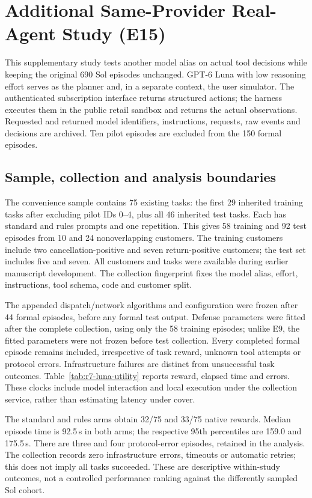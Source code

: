 \section{Additional Same-Provider Real-Agent Study (E15)}\label{sec:r7-luna}
This supplementary study tests another model alias on actual tool decisions while keeping the original 690 Sol episodes unchanged. GPT-6 Luna with low reasoning effort serves as the planner and, in a separate context, the user simulator. The authenticated subscription interface returns structured actions; the harness executes them in the public retail sandbox and returns the actual observations. Requested and returned model identifiers, instructions, requests, raw events and decisions are archived. Ten pilot episodes are excluded from the 150 formal episodes.

\subsection{Sample, collection and analysis boundaries}
The convenience sample contains 75 existing tasks: the first 29 inherited training tasks after excluding pilot IDs 0--4, plus all 46 inherited test tasks. Each has standard and rules prompts and one repetition. This gives 58 training and 92 test episodes from 10 and 24 nonoverlapping customers. The training customers include two cancellation-positive and seven return-positive customers; the test set includes five and seven. All customers and tasks were available during earlier manuscript development. The collection fingerprint fixes the model alias, effort, instructions, tool schema, code and customer split.

The appended dispatch/network algorithms and configuration were frozen after 44 formal episodes, before any formal test output. Defense parameters were fitted after the complete collection, using only the 58 training episodes; unlike E9, the fitted parameters were not frozen before test collection. Every completed formal episode remains included, irrespective of task reward, unknown tool attempts or protocol errors. Infrastructure failures are distinct from unsuccessful task outcomes. Table~\ref{tab:r7-luna-utility} reports reward, elapsed time and errors. These clocks include model interaction and local execution under the collection service, rather than estimating latency under cover.



The standard and rules arms obtain 32/75 and 33/75 native rewards. Median episode time is 92.5\,s in both arms; the respective 95th percentiles are 159.0 and 175.5\,s. There are three and four protocol-error episodes, retained in the analysis. The collection records zero infrastructure errors, timeouts or automatic retries; this does not imply all tasks succeeded. These are descriptive within-study outcomes, not a controlled performance ranking against the differently sampled Sol cohort.

